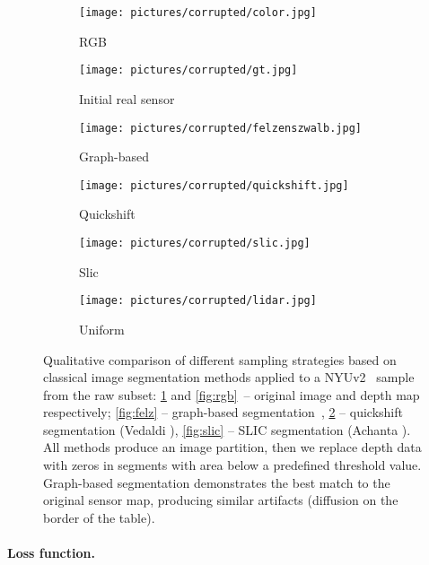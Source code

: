 \documentclass[final]{cvpr}
\begin{document}
    \begin{figure}[t]
      \centering
      \begin{subfigure}[b]{0.32\linewidth}
        \centering
        \texttt{[image: pictures/corrupted/color.jpg]}
        \caption{RGB}
        \label{fig:rgb}
        \centering
        \texttt{[image: pictures/corrupted/gt.jpg]}
        \caption{Initial real sensor}
        \label{fig:gt}
      \end{subfigure}
      \begin{subfigure}[b]{0.32\linewidth}
        \centering
        \texttt{[image: pictures/corrupted/felzenszwalb.jpg]}
        \caption{Graph-based \cite{felzenszwalb}}
        \label{fig:felz}
        \centering
        \texttt{[image: pictures/corrupted/quickshift.jpg]}
        \caption{Quickshift \cite{quickshift}}
        \label{fig:quickshift}
      \end{subfigure}
      \begin{subfigure}[b]{0.32\linewidth}
        \centering
        \texttt{[image: pictures/corrupted/slic.jpg]}
        \caption{Slic \cite{slic}}
        \label{fig:slic}
        \centering
        \texttt{[image: pictures/corrupted/lidar.jpg]}
        \caption{Uniform \cite{Ma2017SparseToDense}}
        \label{fig:lidar}
      \end{subfigure}
      \caption{Qualitative comparison of different sampling strategies based on classical image segmentation methods applied to a NYUv2~\cite{nyuv2} sample from the raw subset:
      \ref{fig:gt} and \ref{fig:rgb}~-- original image and depth map respectively;
      \ref{fig:felz} -- graph-based segmentation~\cite{felzenszwalb},
\ref{fig:quickshift} -- quickshift segmentation (Vedaldi \etal \cite{quickshift}), \ref{fig:slic} -- SLIC segmentation (Achanta \etal \cite{slic}). All methods produce an image partition, then we replace depth data with zeros in segments with area below a predefined threshold value. Graph-based segmentation demonstrates the best match to the original sensor map, producing similar artifacts (\eg diffusion on the border of the table).}
      \label{fig:corrupt}
    \end{figure}
    
    \paragraph{Loss function.}
\end{document}
